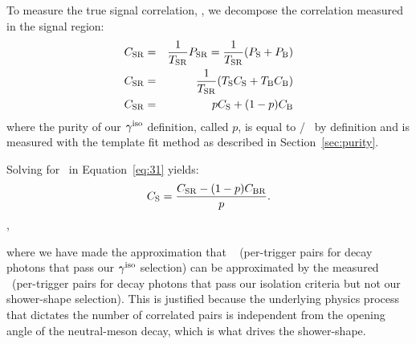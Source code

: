To measure the true signal correlation, \CS , we decompose the correlation measured in the signal region: 
\begin{eqnarray}
C_{\mathrm{SR}} &=& \frac{1}{T_{\mathrm{SR}}}P_{\mathrm{SR}} = \frac{1}{T_{\mathrm{SR}}}(P_{\mathrm{S}} + P_{\mathrm{B}})\\
C_{\mathrm{SR}} &=& \frac{1}{T_{\mathrm{SR}}}(T_{\mathrm{S}}C_{\mathrm{S}} +T_{\mathrm{B}}C_{\mathrm{B}})\\
C_{\mathrm{SR}} &=& pC_{\mathrm{S}}+ (1-p)C_{\mathrm{B}} \label{eq:31}
\end{eqnarray}
where the purity of our $\gamma^\mathrm{iso}$ definition, called $p$, is equal to \TS/\TSR 
~by definition and is measured with the template fit method as described in Section~\ref{sec:purity}.  

Solving for \CS~in Equation~\ref{eq:31} yields:
\begin{equation}
C_{\mathrm{S}} = \frac{C_{\mathrm{SR}} - (1-p) C_{\mathrm{BR}}}{p}.
\label{eq:FinalSubtraction}
\end{equation},

where we have made the approximation that \CB~ (per-trigger pairs for decay photons that pass our $\gamma^\mathrm{iso}$ selection) can be approximated by the measured \CBR~(per-trigger pairs for decay photons that pass our isolation criteria but not our shower-shape selection). This is justified because the underlying physics process that dictates the number of correlated pairs is independent from the opening angle of the neutral-meson decay, which is what drives the shower-shape.


